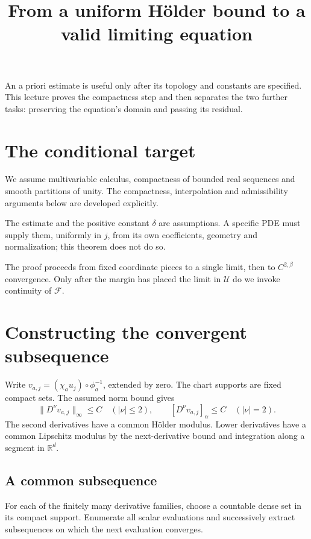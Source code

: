 \documentclass[12pt,reqno]{amsart}
\title{From a uniform H\"older bound to a valid limiting equation}
\date{}
\begin{document}
\maketitle

An a priori estimate is useful only after its topology and constants are
specified. This lecture proves the compactness step and then separates
the two further tasks: preserving the equation's domain and passing its residual.

\section{The conditional target}
We assume multivariable calculus, compactness of bounded real sequences
and smooth partitions of unity. The compactness, interpolation and
admissibility arguments below are developed explicitly.

\begin{definition}\label{def:norm}

\end{definition}
\begin{theorem}\label{thm:closedness}

\end{theorem}

The estimate and the positive constant $\delta$ are assumptions.
A specific PDE must supply them, uniformly in $j$, from its own
coefficients, geometry and normalization; this theorem does not do so.

The proof proceeds from fixed coordinate pieces to a single limit,
then to $C^{2,\beta}$ convergence. Only after the margin has placed the
limit in $\mathcal U$ do we invoke continuity of $\mathcal F$.

\section{Constructing the convergent subsequence}
Write $v_{a,j}=(\chi_a u_j)\circ\phi_a^{-1}$, extended by zero.
The chart supports are fixed compact sets. The assumed norm bound gives
\[
 \|D^\nu v_{a,j}\|_\infty\leq C\quad(|\nu|\leq2),
 \qquad [D^\nu v_{a,j}]_\alpha\leq C\quad(|\nu|=2).
\]
The second derivatives have a common H\"older modulus. Lower derivatives
have a common Lipschitz modulus by the next-derivative bound and
integration along a segment in $\mathbb R^d$.

\subsection*{A common subsequence}
For each of the finitely many derivative families, choose a countable
dense set in its compact support. Enumerate all scalar evaluations and
successively extract subsequences on which the next evaluation converges.
\end{document}
